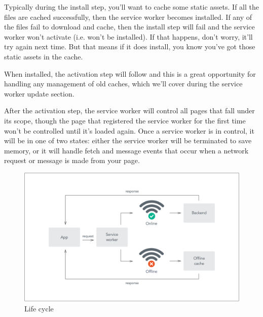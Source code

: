 \documentclass[14pt,a4paper,final]{extreport}
\begin{document}
Typically during the install step, you'll want to cache some static assets. If all the files are cached successfully, then the service worker becomes installed. If any of the files fail to download and cache, then the install step will fail and the service worker won't activate (i.e. won't be installed). If that happens, don't worry, it'll try again next time. But that means if it does install, you know you've got those static assets in the cache.

When installed, the activation step will follow and this is a great opportunity for handling any management of old caches, which we'll cover during the service worker update section.

After the activation step, the service worker will control all pages that fall under its scope, though the page that registered the service worker for the first time won't be controlled until it's loaded again. Once a service worker is in control, it will be in one of two states: either the service worker will be terminated to save memory, or it will handle fetch and message events that occur when a network request or message is made from your page.
\newpage
\begin{figure}[h]
		\includegraphics[scale=.56]{P1.png}
	
    \caption{Life cycle}
\end{figure}
\end{document}
